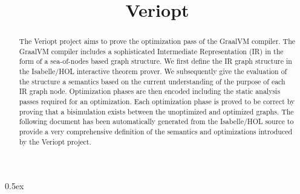 \documentclass[11pt,a4paper]{article}
\begin{document}
\title{Veriopt}
\maketitle

\begin{abstract}
The Veriopt project aims to prove the optimization pass of the GraalVM compiler.
The GraalVM compiler includes a sophisticated Intermediate Representation (IR)
in the form of a sea-of-nodes based graph structure.
We first define the IR graph structure in the Isabelle/HOL interactive theorem prover.
We subsequently give the evaluation of the structure a semantics based on the current
understanding of the purpose of each IR graph node.
Optimization phases are then encoded including the static analysis passes required for
an optimization.
Each optimization phase is proved to be correct by proving that a bisimulation exists
between the unoptimized and optimized graphs.
The following document has been automatically generated from the Isabelle/HOL source
to provide a very comprehensive definition of the semantics and optimizations introduced
by the Veriopt project.
\end{abstract}

\pagebreak

\tableofcontents

\pagebreak

\parindent 0pt\parskip 0.5ex



















































%
%
\end{document}
